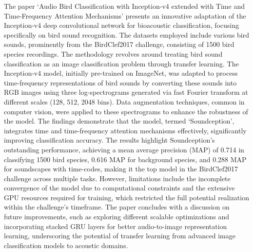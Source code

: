 The paper `Audio Bird Classification with Inception-v4 extended with Time and
Time-Frequency Attention Mechanisms' presents an innovative adaptation of the
Inception-v4 deep convolutional network for bioacoustic classification,
focusing specifically on bird sound recognition. The datasets employed include
various bird sounds, prominently from the BirdClef2017 challenge, consisting of
1500 bird species recordings. The methodology revolves around treating bird
sound classification as an image classification problem through transfer
learning. The Inception-v4 model, initially pre-trained on ImageNet, was
adapted to process time-frequency representations of bird sounds by converting
these sounds into RGB images using three log-spectrograms generated via fast
Fourier transform at different scales (128, 512, 2048 bins). Data augmentation
techniques, common in computer vision, were applied to these spectrograms to
enhance the robustness of the model. The findings demonstrate that the model,
termed `Soundception', integrates time and time-frequency attention mechanisms
effectively, significantly improving classification accuracy. The results
highlight Soundception's outstanding performance, achieving a mean average
precision (MAP) of 0.714 in classifying 1500 bird species, 0.616 MAP for
background species, and 0.288 MAP for soundscapes with time-codes, making it
the top model in the BirdClef2017 challenge across multiple tasks. However,
limitations include the incomplete convergence of the model due to
computational constraints and the extensive GPU resources required for
training, which restricted the full potential realization within the
challenge's timeframe. The paper concludes with a discussion on future
improvements, such as exploring different scalable optimizations and
incorporating stacked GRU layers for better audio-to-image representation
learning, underscoring the potential of transfer learning from advanced image
classification models to acoustic domains.\cite{sevilla2017audio}\\

